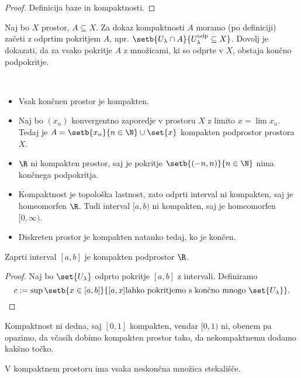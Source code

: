 \begin{proof}
    Definicija baze in kompaktnosti.
\end{proof}

\begin{opomba}
    Naj bo $X$ prostor, $A \subseteq X$. Za dokaz kompaktnosti $A$ moramo (po definiciji) začeti z odprtim pokritjem $A$, npr. $\setb{U_\lambda \cap A}{U_\lambda^\text{odp} \subseteq X}$. Dovolj je dokazati, da za vsako pokritje $A$ z množicami, ki so odprte v $X$, obstaja končno podpokritje.
\end{opomba}

\begin{primer}
    \
    \begin{itemize}
        \item Vsak končnen prostor je kompakten.
        \item Naj bo $(x_n)$ konvergentno zaporedje v prostoru $X$ z limito $x = \lim x_n$. Tedaj je $A = \setb{x_n}{n \in \N} \cup \set{x}$ kompakten podprostor prostora $X$. 
        \item \(\R\) ni kompakten prostor, saj je pokritje \(\setb{(-n, n)}{n \in \N}\) nima končnega podpokritja.
        \item Kompaktnost je topološka lastnost, zato odprti interval ni kompakten, saj je homeomorfen $\R$. Tudi interval $[a,b)$ ni kompakten, saj je homeomorfen $[0, \infty)$.
        \item Diskreten prostor je kompakten natanko tedaj, ko je končen.
    \end{itemize}
\end{primer}

\begin{trditev}
    Zaprti interval $[a,b]$ je kompakten podprostor $\R$.
\end{trditev}

\begin{proof}
    Naj bo $\set{U_\lambda}$ odprto pokritje $[a,b]$ z intervali. Definiramo $$c := \sup \setb{x \in [a,b]}{[a,x] \text{lahko pokritjemo s končno mnogo } \set{U_\lambda}}.$$
\end{proof}

\begin{opomba}
    Kompaktnost ni dedna, saj $[0,1]$ kompakten, vendar $[0,1)$ ni, obenem pa opazimo, da včasih dobimo kompakten prostor tako, da nekompaktnemu dodamo kakšno točko.
\end{opomba}

\begin{izrek}
    V kompaktnem prostoru ima vsaka neskončna množica stekališče.
\end{izrek}

